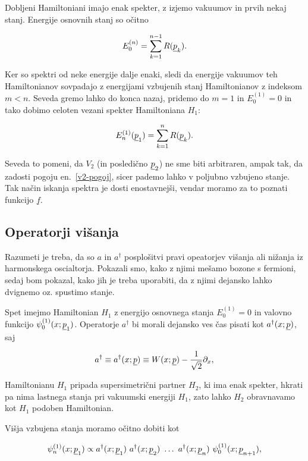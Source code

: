 \ni Dobljeni Hamiltoniani imajo enak spekter, z izjemo vakuumov in prvih nekaj stanj. Energije 
osnovnih stanj so o\v citno

\begin{equation}
	E^{(n)}_0 = \sum_{k = 1}^{n - 1} R(\underline{p}_k).
\end{equation}

Ker so spektri od neke energije dalje enaki, sledi da energije vakuumov teh Hamiltonianov sovpadajo z energijami
vzbujenih stanj Hamiltonianov z indeksom $m < n$. Seveda gremo lahko do konca nazaj, pridemo do
$m = 1$ in $E^{(1)}_0 = 0$ in tako dobimo celoten vezani spekter Hamiltoniana $H_1$:

\begin{equation}
	E_n^{(1)} (\underline{p}_1) = \sum_{k = 1}^n R (\underline{p}_k).
	\label{v2-pogoj}
\end{equation}

\ni Seveda to pomeni, da $V_2$ (in posledi\v cno $\underline{p}_2$) ne sme biti arbitraren, ampak tak, da zadosti pogoju
en.~\eqref{v2-pogoj}, sicer pademo lahko v poljubno vzbujeno stanje. Tak na\v cin iskanja spektra je dosti
enostavnej\v si, vendar moramo za to poznati funkcijo $\underline{f}$. 

\subsection{Operatorji vi\v sanja}

Razumeti je treba, da so $a$ in $a^\dagger$ posplo\v sitvi pravi opeatorjev vi\v sanja ali ni\v zanja iz harmonskega
oscialtorja. Pokazali smo, kako z njimi me\v samo bozone s fermioni, sedaj bom pokazal, kako jih
je treba uporabiti, da z njimi dejansko lahko dvignemo oz. spustimo stanje.

Spet imejmo Hamiltonian $H_1$ z energijo osnovnega stanja $E^{(1)}_0 = 0$ in valovno funkcijo
$\psi_0^{(1)} (x; \underline{p}_1)$. Operatorje $a^\dagger$ bi morali dejansko ves \v cas pisati kot $a^\dagger (x; \underline{p})$,
saj

\[
	a^\dagger \equiv a^\dagger (x; \underline{p}) \equiv W(x; \underline{p}) - \frac{1}{\sqrt{2}}\partial_x,
\]

Hamiltonianu $H_1$ pripada supersimetri\v cni partner $H_2$, ki ima enak spekter, hkrati pa nima lastnega
stanja pri vakuumski energiji $H_1$, zato lahko $H_2$ obravnavamo kot $H_1$ podoben Hamiltonian.

Vi\v sja vzbujena stanja moramo o\v citno dobiti kot

\begin{equation}
	\psi^{(1)}_n (x; \underline{p}_1) \propto a^\dagger (x;\underline{p}_1)\ a^\dagger (x;\underline{p}_2)\ \ldots\ a^\dagger (x; \underline{p}_n)\
		\psi^{(1)}_0 (x; \underline{p}_{n+1}),
\end{equation}

